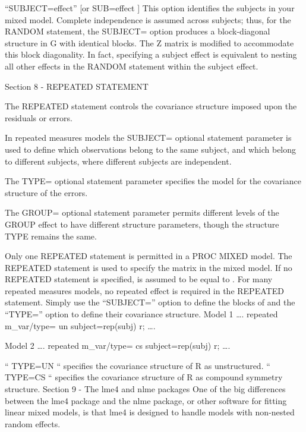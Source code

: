 “SUBJECT=effect” 		[or SUB=effect ]
This option identifies the subjects in your mixed model. Complete independence is assumed across subjects; thus, for the RANDOM statement, the SUBJECT= option produces a block-diagonal structure in G with identical blocks. 
The Z matrix is modified to accommodate this block diagonality. 
In fact, specifying a subject effect is equivalent to nesting all other effects in the RANDOM statement within the subject effect. 







Section 8 - REPEATED STATEMENT

The REPEATED statement controls the covariance structure imposed upon the residuals or errors.

 In repeated measures models the SUBJECT= optional statement parameter is used to define which observations belong to the same subject, and which belong to different subjects, where different subjects are independent. 

The TYPE= optional statement parameter specifies the model for the covariance structure of the errors. 

The GROUP= optional statement parameter permits different levels of the GROUP effect to have different structure parameters, though the structure TYPE remains the same. 

Only one REPEATED statement is permitted in a PROC MIXED model.
The REPEATED statement is used to specify the   matrix in the mixed model. 
If no REPEATED statement is specified,  is assumed to be equal to  .
For many repeated measures models, no repeated effect is required in the REPEATED statement. Simply use the “SUBJECT=” option to define the blocks of   and the “TYPE=” option to define their covariance structure.
Model 1
….
repeated m_var/type= un subject=rep(subj) r;
….

Model 2
….
repeated m_var/type= cs subject=rep(subj) r;
….

“ TYPE=UN “ specifies the covariance structure of R as unstructured.
“ TYPE=CS “ specifies the covariance structure of R as compound symmetry structure.
Section 9 - The lme4 and nlme packages
One of the big differences between the lme4 package and the nlme package, or other software for fitting linear mixed models, is that lme4 is designed to handle models with non-nested random effects.


